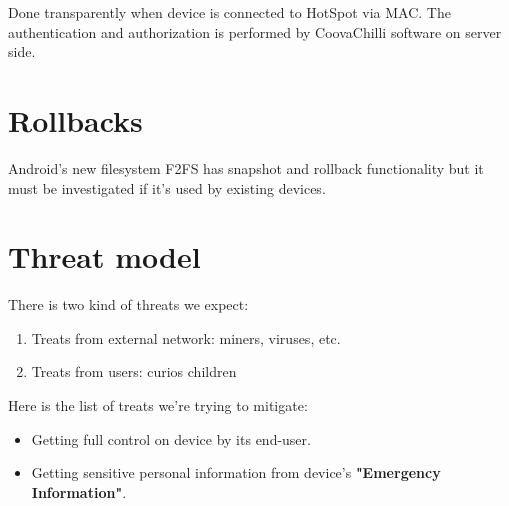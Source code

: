 Done transparently when device is connected to HotSpot via MAC. The
authentication and authorization is performed by CoovaChilli software
on server side.


\section{Rollbacks}

Android's new filesystem F2FS has snapshot and rollback functionality
but it must be investigated if it's used by existing devices.


\section{Threat model}

There is two kind of threats we expect:

\begin{enumerate}
\item Treats from external network: miners, viruses, etc.
\item Treats from users: curios children
\end{enumerate}

Here is the list of treats we're trying to mitigate:

\begin{itemize}
\item Getting full control on device by its end-user.
\item Getting sensitive personal information from device's
\textbf{"Emergency Information"}.
\end{itemize}

